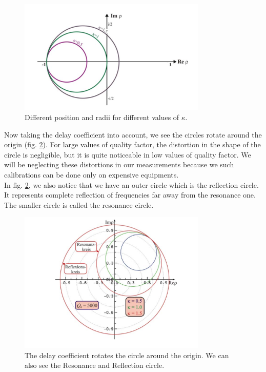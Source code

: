 \documentclass[a4paper]{article}
\numberwithin{equation}{section}
\begin{document}
\begin{figure}[hbt!]
    \centering
    \includegraphics[width=0.8\textwidth]{circles}
	\caption{Different position and radii for different values of $\kappa$. \cite{Switka22}}
    \label{fig:circles}
\end{figure}

Now taking the delay coefficient into account, we see the circles rotate around the origin (fig. \ref{fig:delay}). For large values of quality factor, the distortion in the shape of the circle is negligible, but it is quite noticeable in low values of quality factor. We will be neglecting these distortions in our measurements because we such calibrations can be done only on expensive equipments. \\
In fig. \ref{fig:delay}, we also notice that we have an outer circle which is the reflection circle. It represents complete reflection of frequencies far away from the resonance one. The smaller circle is called the resonance circle. 

\begin{figure}[hbt!]
    \centering
    \includegraphics[width=0.8\textwidth]{delay}
	\caption{The delay coefficient rotates the circle around the origin. We can also see the Resonance and Reflection circle. \cite{Switka22}}
    \label{fig:delay}
\end{figure}
\end{document}
